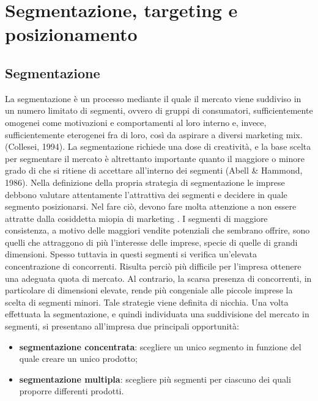 \chapter{Segmentazione, targeting e posizionamento}
\section{Segmentazione}
La segmentazione è un processo mediante il quale il mercato viene suddiviso in un numero limitato di segmenti, ovvero di gruppi di consumatori, sufficientemente omogenei come motivazioni e comportamenti al loro interno e, invece, sufficientemente eterogenei fra di loro, così da aspirare a diversi marketing mix.(Collesei, 1994). \newline
La segmentazione richiede una dose di creatività, e la base scelta per segmentare il mercato è altrettanto importante quanto il maggiore o minore grado di che si ritiene di accettare all’interno dei segmenti (Abell \& Hammond, 1986). \newline
Nella definizione della propria strategia di segmentazione le imprese debbono valutare attentamente l’attrattiva dei segmenti e decidere in quale segmento posizionarsi. Nel fare ciò, devono fare molta attenzione a non essere attratte dalla cosiddetta miopia di marketing . I segmenti di maggiore consistenza, a motivo delle maggiori vendite potenziali che sembrano offrire, sono quelli che attraggono di più l’interesse delle imprese, specie di quelle di grandi dimensioni. Spesso tuttavia in questi segmenti si verifica un’elevata concentrazione di concorrenti. Risulta perciò più difficile per l’impresa ottenere una adeguata quota di mercato. Al contrario, la scarsa presenza di concorrenti, in particolare di dimensioni elevate, rende più congeniale alle piccole imprese la scelta di segmenti minori. Tale strategie viene definita di nicchia. \newline
Una volta effettuata la segmentazione, e quindi individuata una suddivisione del mercato in segmenti, si presentano all’impresa due principali opportunità:
\begin{itemize}
	\item \textbf{segmentazione concentrata}: scegliere un unico segmento in funzione del quale creare un unico prodotto;
	\item \textbf{segmentazione multipla}: scegliere più segmenti per ciascuno dei quali proporre differenti prodotti.
\end{itemize}

